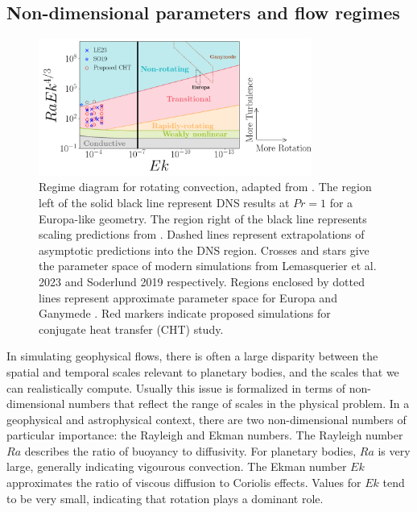 \documentclass{article}
\begin{document}
\subsection{Non-dimensional parameters and flow regimes}
\begin{figure}
	\begin{center}
		\includegraphics[width=0.8\textwidth]{figures/reg_diagram}
	\end{center}
	\caption{Regime diagram for rotating convection, adapted from \citep{dL23,tG16}. The region left of the solid black line represent DNS results at $Pr = 1$ for a Europa-like geometry\citep{aB22}. The region right of the black line represents scaling predictions from \citep{tG16}. Dashed lines represent extrapolations of asymptotic predictions into the DNS region. Crosses and stars give the parameter space of modern simulations from Lemasquerier et al. 2023\citep{dL23} and Soderlund 2019\citep{kS19} respectively. Regions enclosed by dotted lines represent approximate parameter space for Europa and Ganymede \citep{dL23,kS19}. Red markers indicate proposed simulations for conjugate heat transfer (CHT) study.}
	\label{f:reg_d}
\end{figure}
In simulating geophysical flows, there is often a large disparity between the spatial and temporal scales relevant to planetary bodies, and the scales that we can realistically compute. Usually this issue is formalized in terms of non-dimensional numbers that reflect the range of scales in the physical problem. %
In a geophysical and astrophysical context, there are two non-dimensional numbers of particular importance: the Rayleigh and Ekman numbers. The Rayleigh number $Ra$ describes the ratio of buoyancy to diffusivity. For planetary bodies, $Ra$ is very large, generally indicating vigourous convection.
The Ekman number $Ek$ approximates the ratio of viscous diffusion to Coriolis effects. Values for $Ek$ tend to be very small, indicating that rotation plays a dominant role.
\end{document}
